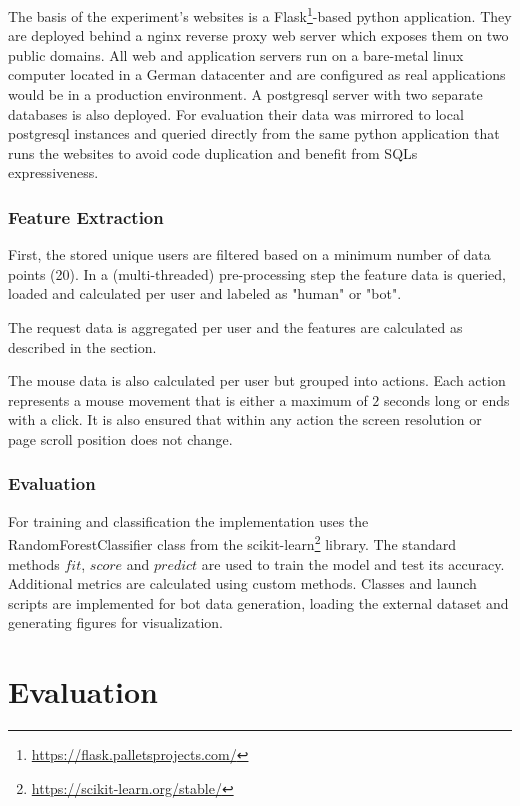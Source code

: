 \documentclass[
    fontsize=12pt,
    headings=small,
    parskip=half,           %
    bibliography=totoc,
    numbers=noenddot,       %
    open=any,               %
    final                   %
]{scrreprt}
\begin{document}
The basis of the experiment's websites is a Flask\footnote{\url{https://flask.palletsprojects.com/}}-based python application. They are deployed behind a nginx reverse proxy web server which exposes them on two public domains. All web and application servers run on a bare-metal linux computer located in a German datacenter and are configured as real applications would be in a production environment. A postgresql server with two separate databases is also deployed. For evaluation their data was mirrored to local postgresql instances and queried directly from the same python application that runs the websites to avoid code duplication and benefit from SQLs expressiveness.

\subsection{Feature Extraction}

First, the stored unique users are filtered based on a minimum number of data points (20). In a (multi-threaded) pre-processing step the feature data is queried, loaded and calculated per user and labeled as "human" or "bot".

The request data is aggregated per user and the features are calculated as described in the  section.

The mouse data is also calculated per user but grouped into actions. Each action represents a mouse movement that is either a maximum of $2$ seconds long or ends with a click. It is also ensured that within any action the screen resolution or page scroll position does not change.

\subsection{Evaluation}

For training and classification the implementation uses the RandomForestClassifier class from the scikit-learn\footnote{\url{https://scikit-learn.org/stable/}} library. The standard methods $fit$, $score$ and $predict$ are used to train the model and test its accuracy. Additional metrics are calculated using custom methods. Classes and launch scripts are implemented for bot data generation, loading the external dataset and generating figures for visualization.


\chapter{Evaluation}
\end{document}
